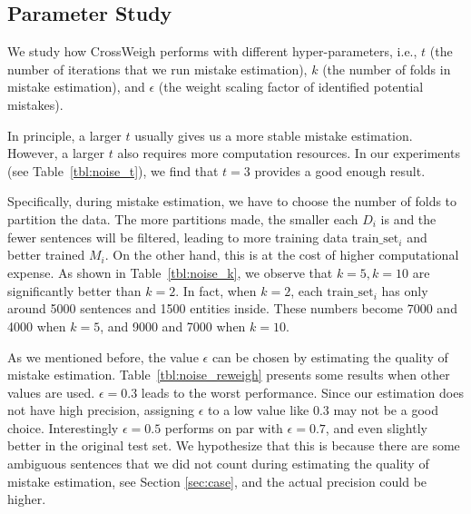 \documentclass[11pt,a4paper]{article}
\newcommand{\our}{\mbox{\sf CrossWeigh}\xspace}
\begin{document}
%
     

    \subsection{Parameter Study}
        We study how \our performs with different hyper-parameters, i.e., $t$ (the number of iterations that we run mistake estimation), $k$ (the number of folds in mistake estimation), and $\epsilon$ (the weight scaling factor of identified potential mistakes).


        In principle, 
a larger $t$ usually gives us a more stable mistake estimation.
        However, a larger $t$ also requires more computation resources. In our experiments (see Table~\ref{tbl:noise_t}), we find that $t = 3$ provides a good enough result.
        
        Specifically, during mistake estimation, we have to choose the number of folds to partition the data.
        The more partitions made, the smaller each $D_i$ is and the fewer sentences will be filtered, leading to more training data $\mbox{train\_set}_i$ and better trained $M_i$. 
        On the other hand, this is at the cost of higher computational expense. 
        As shown in Table~\ref{tbl:noise_k}, we observe that $k = 5, k = 10$ are significantly better than $k = 2$. 
        In fact, when $k = 2$, each $\mbox{train\_set}_i$ has only around 5000 sentences and 1500 entities inside.
        These numbers become 7000 and 4000 when $k = 5$, and 9000 and 7000 when $k = 10$.


        As we mentioned before, the value $\epsilon$ can be chosen by estimating the quality of mistake estimation. 
        Table~\ref{tbl:noise_reweigh} presents some results when other values are used.
$\epsilon = 0.3$ leads to the worst performance.
        Since our estimation does not have high precision, assigning $\epsilon$ to a low value like $0.3$ may not be a good choice.
        Interestingly $\epsilon = 0.5$ performs on par with $\epsilon = 0.7$, and even slightly better in the original test set.
We hypothesize that this is because there are some ambiguous sentences that we did not count during estimating the quality of mistake estimation, see Section \ref{sec:case}, and the actual precision could be higher.
\end{document}
